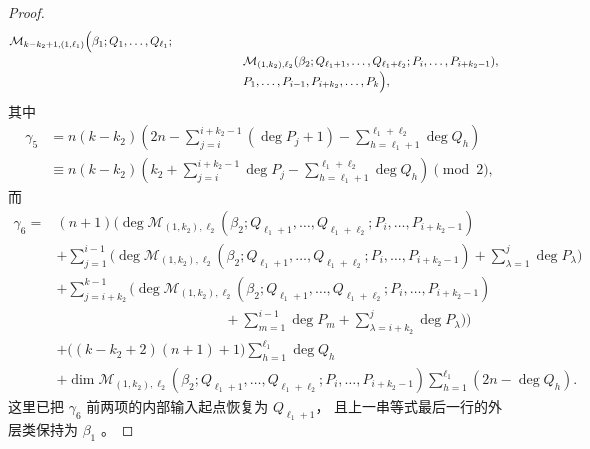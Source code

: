 \begin{proof}
\[\begin{aligned}
\mathcal M_{k-k_2+1,(1,\ell_1)}
\Bigl(\beta_1;Q_1,\ldots,Q_{\ell_1};\\[-2pt]
&\hspace{6em}{}
\mathcal M_{(1,k_2),\ell_2}
(\beta_2;Q_{\ell_1+1},\ldots,Q_{\ell_1+\ell_2};
P_i,\ldots,P_{i+k_2-1}),\\[-2pt]
&\hspace{6em}{}
P_1,\ldots,P_{i-1},P_{i+k_2},\ldots,P_k\Bigr),
\end{aligned}
\]
\endgroup
其中
\[
\begin{aligned}
\gamma_5
&=n(k-k_2)\left(
2n-\sum_{j=i}^{i+k_2-1}(\deg P_j+1)
-\sum_{h=\ell_1+1}^{\ell_1+\ell_2}\deg Q_h\right)\\
&\equiv n(k-k_2)\left(
k_2+\sum_{j=i}^{i+k_2-1}\deg P_j
-\sum_{h=\ell_1+1}^{\ell_1+\ell_2}\deg Q_h\right)
\pmod2,
\end{aligned}
\]
而
\begingroup
\small
\[
\begin{aligned}
\gamma_6={}&(n+1)\Bigg(
\deg\mathcal M_{(1,k_2),\ell_2}
(\beta_2;Q_{\ell_1+1},\ldots,Q_{\ell_1+\ell_2};
P_i,\ldots,P_{i+k_2-1})\\
&+\sum_{j=1}^{i-1}\Bigg(
\deg\mathcal M_{(1,k_2),\ell_2}
(\beta_2;Q_{\ell_1+1},\ldots,Q_{\ell_1+\ell_2};
P_i,\ldots,P_{i+k_2-1})
+\sum_{\lambda=1}^{j}\deg P_\lambda\Bigg)\\
&+\sum_{j=i+k_2}^{k-1}\Bigg(
\deg\mathcal M_{(1,k_2),\ell_2}
(\beta_2;Q_{\ell_1+1},\ldots,Q_{\ell_1+\ell_2};
P_i,\ldots,P_{i+k_2-1})\\[-2pt]
&\hspace{12em}{}+\sum_{m=1}^{i-1}\deg P_m
+\sum_{\lambda=i+k_2}^{j}\deg P_\lambda\Bigg)\Bigg)\\
&+\bigl((k-k_2+2)(n+1)+1\bigr)
\sum_{h=1}^{\ell_1}\deg Q_h\\
&+\dim\mathcal M_{(1,k_2),\ell_2}
(\beta_2;Q_{\ell_1+1},\ldots,Q_{\ell_1+\ell_2};
P_i,\ldots,P_{i+k_2-1})
\sum_{h=1}^{\ell_1}(2n-\deg Q_h).
\end{aligned}
\]
\endgroup
这里已把 $\gamma_6$ 前两项的内部输入起点恢复为 $Q_{\ell_1+1}$，
且上一串等式最后一行的外层类保持为 $\beta_1$
。


\end{proof}
